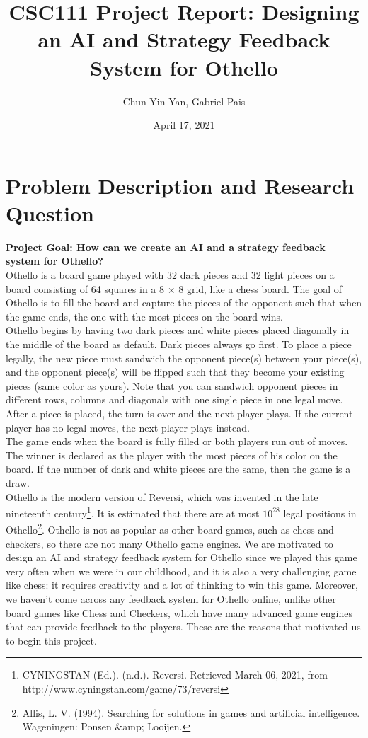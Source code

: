 \documentclass[fontsize=11pt]{article}
\title{CSC111 Project Report: Designing an AI and Strategy Feedback System for Othello}
\author{Chun Yin Yan, Gabriel Pais}
\date{April 17, 2021}
\begin{document}
\maketitle

\section*{Problem Description and Research Question}

\textbf{Project Goal: How can we create an AI and a strategy feedback system for Othello?}\\

Othello is a board game played with 32 dark pieces and 32 light pieces on a board consisting of 64 squares in a 8 $\times$ 8 grid, like a chess board. The goal of Othello is to fill the board and capture the pieces of the opponent such that when the game ends, the one with the most pieces on the board wins.\\

Othello begins by having two dark pieces and white pieces placed diagonally in the middle of the board as default. Dark pieces always go first. To place a piece legally, the new piece must sandwich the opponent piece(s) between your piece(s), and the opponent piece(s) will be flipped such that they become your existing pieces (same color as yours). Note that you can sandwich opponent pieces in different rows, columns and diagonals with one single piece in one legal move. After a piece is placed, the turn is over and the next player plays. If the current player has no legal moves, the next player plays instead.\\

The game ends when the board is fully filled or both players run out of moves. The winner is declared as the player with the most pieces of his color on the board. If the number of dark and white pieces are the same, then the game is a draw.\\

Othello is the modern version of Reversi, which was invented in the late nineteenth century\footnote{CYNINGSTAN (Ed.). (n.d.). Reversi. Retrieved March 06, 2021, from http://www.cyningstan.com/game/73/reversi}. It is estimated that there are at most $10^{28}$ legal positions in Othello\footnote{Allis, L. V. (1994). Searching for solutions in games and artificial intelligence. Wageningen: Ponsen &amp; Looijen.}. Othello is not as popular as other board games, such as chess and checkers, so there are not many Othello game engines. We are motivated to design an AI and strategy feedback system for Othello since we played this game very often when we were in our childhood, and it is also a very challenging game like chess: it requires creativity and a lot of thinking to win this game. Moreover, we haven't come across any feedback system for Othello online, unlike other board games like Chess and Checkers, which have many advanced game engines that can provide feedback to the players. These are the reasons that motivated us to begin this project.\\
\end{document}
